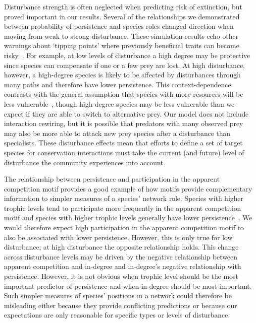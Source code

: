 \documentclass[12pt]{article}
\begin{document}
\begin{spacing}{2.0}
    Disturbance strength is often neglected when predicting risk of extinction, but proved important in our results.
    Several of the relationships we demonstrated between probability of persistence and species roles changed direction when moving from weak to strong disturbance.
    These simulation results echo other warnings about `tipping points' where previously beneficial traits can become risky~\citep{Latty2019,Golubski2016,Tylianakis2014}.
    For example, at low levels of disturbance a high degree may be protective since species can compensate if one or a few prey are lost. 
    At high disturbance, however, a high-degree species is likely to be affected by disturbances through many paths and therefore have lower persistence.
    This context-dependence contrasts with the general assumption that species with more resources will be less vulnerable~\citep{Allesina2012,binzer2011susceptibility}, though high-degree species may be less vulnerable than we expect if they are able to switch to alternative prey.
    Our model does not include interaction rewiring, but it is possible that predators with many observed prey may also be more able to attack new prey species after a disturbance than specialists.
    These disturbance effects mean that efforts to define a set of target species for conservation interactions must take the current (and future) level of disturbance the community experiences into account.
    

    The relationship between persistence and participation in the apparent competition motif provides a good example of how motifs provide complementary information to simpler measures of a species' network role.
    Species with higher trophic levels tend to participate more frequently in the apparent competition motif and
    species with higher trophic levels generally have lower persistence~\citep{Eklof2006,Eklof2013}. 
    We would therefore expect high participation in the apparent competition motif to also be associated with lower persistence.
    However, this is only true for low disturbance; at high disturbance the opposite relationship holds.
    This change across disturbance levels may be driven by the negative relationship between apparent competition and in-degree and in-degree's negative relationship with persistence.
    However, it is not obvious when trophic level should be the most important predictor of persistence and when in-degree should be most important.
    Such simpler measures of species' positions in a network could therefore be misleading either because they provide conflicting predictions or because our expectations are only reasonable for specific types or levels of disturbance.



\end{spacing}
\end{document}

